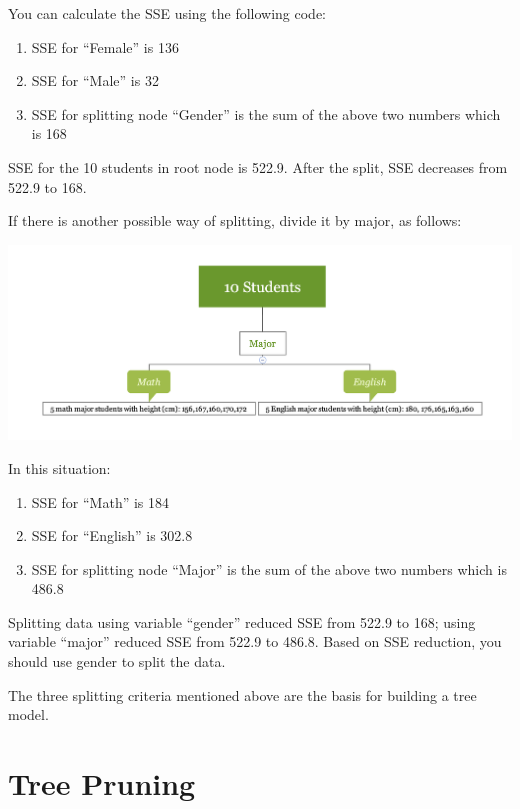\documentclass[12pt,]{krantz}
\providecommand{\tightlist}{%
  \setlength{\itemsep}{0pt}\setlength{\parskip}{0pt}}
\begin{document}
You can calculate the SSE using the following code:

\begin{enumerate}
\def\labelenumi{\arabic{enumi}.}
\tightlist
\item
  SSE for ``Female'' is 136
\item
  SSE for ``Male'' is 32
\item
  SSE for splitting node ``Gender'' is the sum of the above two numbers which is 168
\end{enumerate}

SSE for the 10 students in root node is 522.9. After the split, SSE decreases from 522.9 to 168.

If there is another possible way of splitting, divide it by major, as follows:

\includegraphics{images/varEN2.png}

In this situation:

\begin{enumerate}
\def\labelenumi{\arabic{enumi}.}
\tightlist
\item
  SSE for ``Math'' is 184
\item
  SSE for ``English'' is 302.8
\item
  SSE for splitting node ``Major'' is the sum of the above two numbers which is 486.8
\end{enumerate}

Splitting data using variable ``gender'' reduced SSE from 522.9 to 168; using variable ``major'' reduced SSE from 522.9 to 486.8. Based on SSE reduction, you should use gender to split the data.

The three splitting criteria mentioned above are the basis for building a tree model.

\hypertarget{tree-pruning}{%
\section{Tree Pruning}\label{tree-pruning}}
\end{document}
